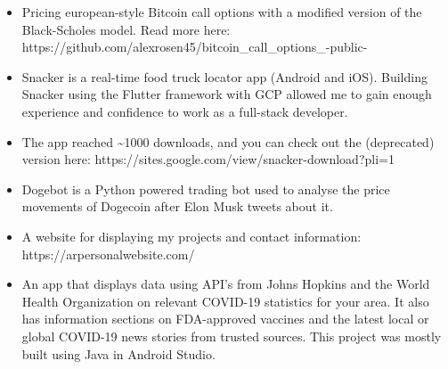 \smallskip
\smallskip
{}
\begin{itemize}
\item Pricing european-style Bitcoin call options with a modified version of the
Black-Scholes model. Read more here: https://github.com/alexrosen45/bitcoin\_call\_options\_-public-
\end{itemize}
\smallskip
\smallskip
{}
\begin{itemize}
\item Snacker is a real-time food truck locator app (Android and iOS). Building Snacker using the Flutter framework with GCP allowed me to gain enough experience and confidence to work as a full-stack developer.
\item The app reached \textasciitilde 1000 downloads, and you can check out the (deprecated) version here: https://sites.google.com/view/snacker-download?pli=1
\end{itemize}
\smallskip
\smallskip
{}
\begin{itemize}
\item Dogebot is a Python powered trading bot used to analyse the price movements of Dogecoin
after Elon Musk tweets about it.
\end{itemize}
\smallskip
\smallskip
{}
\begin{itemize}
\item A website for displaying my projects and contact information:
https://arpersonalwebsite.com/
\end{itemize}
\smallskip
\smallskip
{}
\begin{itemize}
\item An app that displays data using API's from Johns Hopkins and the World
Health Organization on relevant COVID-19 statistics for your area. It also
has information sections on FDA-approved vaccines and the latest local
or global COVID-19 news stories from trusted sources. This project was mostly
built using Java in Android Studio.
\end{itemize}
\cvproject{}